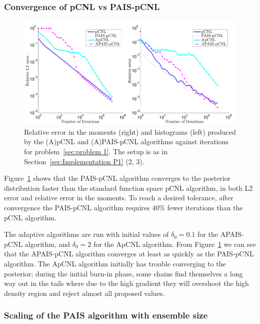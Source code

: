 \documentclass[final]{siamltex}
\begin{document}
\subsubsection{Convergence of pCNL vs PAIS-pCNL}

\begin{figure}[h]
\begin{center}
\includegraphics[width=\textwidth]{"figures/pCNL1_error"}
\caption{Relative error in the moments (right) and histograms (left) produced by the (A)pCNL and (A)PAIS-pCNL algorithms against iterations for problem~\ref{sec:problem 1}. The setup is as in Section~\ref{sec:Implementation P1} (2, 3).}
\label{fig:MH1 L2}
\end{center}
\end{figure}

Figure~\ref{fig:MH1 L2} shows that the PAIS-pCNL algorithm converges to the posterior distribution faster than the standard function space pCNL algorithm, in both L2 error and relative error in the moments. To reach a desired tolerance, after convergence the PAIS-pCNL algorithm requires 40\% fewer iterations than the pCNL algorithm.

The adaptive algorithms are run with initial values of $\delta_0=0.1$ for the APAIS-pCNL algorithm, and $\delta_0=2$ for the ApCNL algorithm. From Figure~\ref{fig:MH1 L2} we can see that the APAIS-pCNL algorithm converges at least as quickly as the PAIS-pCNL algorithm. The ApCNL algorithm initially has trouble converging to the posterior; during the initial burn-in phase, some chains find themselves a long way out in the tails where due to the high gradient they will overshoot the high density region and reject almost all proposed values.

\subsubsection{Scaling of the PAIS algorithm with ensemble size}
\end{document}
